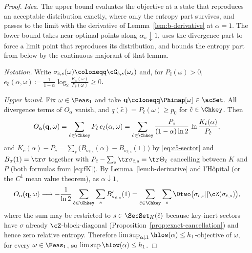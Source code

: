 \begin{proof}
\emph{Idea.} The upper bound evaluates the objective at a state that
reproduces an acceptable distribution exactly, where only the entropy part
survives, and passes to the limit with the derivative of
Lemma~\ref{lem:b-derivative} at $\alpha=1$. The lower bound takes
near-optimal points along $\alpha_n\downarrow1$, uses the divergence part
to force a limit point that reproduces its distribution, and bounds the
entropy part from below by the continuous majorant of that lemma.

\emph{Notation.} Write $\sigma_{\hat c,s}(\omega)\coloneqq\cG_{\hat c,s}(\omega_s)$ and,
for $P_{\hat c}(\omega)>0$,
$e_{\hat c}(\alpha,\omega)\coloneqq\frac{1}{1-\alpha}\log_2
\frac{K_{\hat c}(\omega)}{P_{\hat c}(\omega)}\ge0$.

\emph{Upper bound.} Fix $\omega\in\Feas_1$ and take
$\mathbf q\coloneqq\Phimap[\omega]\in\acSet$. All divergence terms of
$O_{\alpha}$ vanish, and $q(\hat c)=P_{\hat c}(\omega)\ge p_0$ for
$\hat c\in\Chkey$. Then
\begin{equation*}
  O_{\alpha}(\mathbf q,\omega)
  =\sum_{\hat c\in\Chkey}P_{\hat c}\,e_{\hat c}(\alpha,\omega)
  =\sum_{\hat c\in\Chkey}\frac{P_{\hat c}}{(1-\alpha)\ln2}\,
  \ln\frac{K_{\hat c}(\alpha)}{P_{\hat c}} ,
\end{equation*}
and $K_{\hat c}(\alpha)-P_{\hat c}
=\sum_{s}\big(B_{\sigma_{\hat c,s}}(\alpha)
-B_{\sigma_{\hat c,s}}(1)\big)$ by \eqref{eq:c5-sector} and
$B_{\sigma}(1)=\tr\sigma$ together with
$P_{\hat c}-\sum_s\tr\sigma_{\hat c,s}=\tr\Theta_{\hat c}$ cancelling
between $K$ and $P$ (both formulas from \eqref{eq:fK}). By
Lemma~\ref{lem:b-derivative} and l'H\^opital (or the $C^1$ mean value
theorem), as $\alpha\downarrow1$,
\begin{equation*}
  O_{\alpha}(\mathbf q,\omega)\longrightarrow
  -\frac{1}{\ln2}\sum_{\hat c\in\Chkey}\sum_{s}
  B'_{\sigma_{\hat c,s}}(1)
  =\sum_{\hat c\in\Chkey}\sum_{s}
  \Dtwo\big(\sigma_{\hat c,s}\|\cZ(\sigma_{\hat c,s})\big),
\end{equation*}
where the sum may be restricted to $s\in\SecSet_K(\hat c)$ because
key-inert sectors have $\sigma$ already $\cZ$-block-diagonal
(Proposition~\ref{prop:exact-cancellation}) and hence zero relative entropy. Therefore
$\limsup_{\alpha\downarrow1}\hlow(\alpha)\le
h_1$-objective of $\omega$, for every $\omega\in\Feas_1$, so
$\limsup\hlow(\alpha)\le h_1$.


\end{proof}
